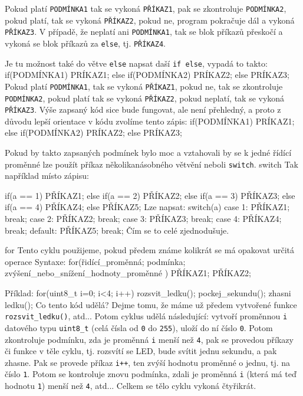 Pokud platí { \tt  PODMÍNKA1} tak se vykoná { \tt  PŘÍKAZ1}, pak se zkontroluje { \tt  PODMÍNKA2}, pokud platí, tak se vykoná { \tt  PŘÍKAZ2}, pokud ne, program pokračuje dál a vykoná { \tt  PŘÍKAZ3}.
V případě, že neplatí ani { \tt  PODMÍNKA1}, tak se blok příkazů přeskočí a vykoná se blok příkazů za { \tt  else}, tj. { \tt  PŘÍKAZ4}.

Je tu možnost také do větve { \tt  else} napsat daší { \tt  if else}, vypadá to takto:
 \begtt 
if(PODMÍNKA1)
{
  PRÍKAZ1;
}
else
{
  if(PODMÍNKA2)
  {
    PRÍKAZ2;
  }
  else
  {
    PRÍKAZ3;
  }
}
\endtt
Pokud platí { \tt  PODMÍNKA1}, tak se vykoná { \tt  PŘÍKAZ1}, pokud ne, tak se zkontroluje { \tt  PODMÍNKA2}, pokud platí tak se vykoná { \tt  PŘÍKAZ2}, pokud neplatí, tak se vykoná { \tt  PŘÍKAZ3}. Výše zapsaný kód sice bude fungovat, ale není přehledný, a proto z důvodu lepší orientace v kódu zvolíme tento zápis:
 \begtt 
if(PODMÍNKA1)
{
  PRÍKAZ1;
}
else if(PODMÍNKA2)
{
  PRÍKAZ2;
}
else
{
  PRÍKAZ3;
}
\endtt


Pokud by takto zapsaných podmínek bylo moc a vztahovali by se k jedné řídící proměnné lze použít příkaz několikanásobného větvění neboli {\tt switch}. \ii switch Tak například místo zápisu:

 \begtt 
if(a == 1)
{
  PŘÍKAZ1;
}
else if(a == 2)
{
  PŘÍKAZ2;
}
else if(a == 3)
{
  PŘÍKAZ3;
}
else if(a == 4)
{
  PŘÍKAZ4;
}
else
{
  PŘÍKAZ5;
}
\endtt
Lze napsat:
 \begtt 
switch(a)
{
  case 1:
    PŘÍKAZ1;
    break;
  case 2:
    PŘÍKAZ2;
    break;
  case 3:
    PŘÍKAZ3;
    break;
  case 4:
    PŘÍKAZ4;
    break;
  default:
    PŘÍKAZ5;
    break;
}
\endtt
Čím se to celé zjednodušuje.


\ii for Tento cyklu použijeme, pokud předem známe kolikrát se má opakovat určitá operace
Syntaxe:
 \begtt 
for(řidící_proměnná; podmínka; zvýšení_nebo_snížení_hodnoty_proměnné )
{
  PŘÍKAZ1;
  PŘÍKAZ2;
}
\endtt

Příklad:
 \begtt 
for(uint8_t i=0; i<4; i++)
{
  rozsvit_ledku();
  pockej_sekundu();
  zhasni ledku();
}
\endtt
Co tento kód udělá? Dejme tomu, že máme už předem vytvořené funkce { \tt  rozsvit\_ledku()}, atd... Potom cyklus udělá následující: vytvoří proměnnou { \tt  i} datového typu { \tt  uint8\_t} (celá čísla od { \tt  0} do { \tt  255}), uloží do ní číslo { \tt  0}. Potom zkontroluje podmínku, zda je proměnná { \tt  i} menší než { \tt  4}, pak se provedou příkazy či funkce v těle cyklu, tj. rozsvítí se LED, bude svítit jednu sekundu, a pak zhasne. Pak se provede příkaz { \tt  i++}, ten zvýší hodnotu proměnné o jednu, tj. na číslo { \tt  1}. Potom se kontroluje znovu podmínka, zdali je proměnná { \tt  i} (která má teď hodnotu { \tt  1}) menší než { \tt  4}, atd... Celkem se tělo cyklu vykoná čtyřikrát.

